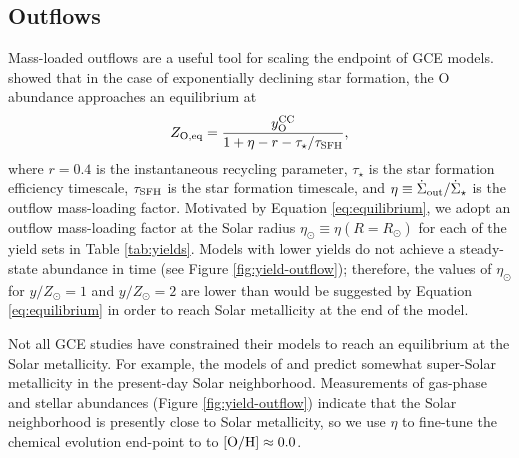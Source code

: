 \documentclass[twocolumn,twocolappendix,linenumbers]{aastex631}
\newcommand{\mathOH}{{\rm [O/H]}}
\newcommand{\yZ}[1]{$y/Z_\odot=#1$}
\begin{document}
\subsection{Outflows}
\label{sec:outflows}

Mass-loaded outflows are a useful tool for scaling the endpoint of GCE models. \citet{weinberg_equilibrium_2017} showed that in the case of exponentially declining star formation, the O abundance approaches an equilibrium at
\begin{equation}
    \label{eq:equilibrium}
    Z_{\rm O,eq} = \frac{y_{\rm O}^{\rm CC}}{1 + \eta - r - \tau_\star/\tau_{\rm SFH}},
\end{equation}
where $r=0.4$ is the instantaneous recycling parameter, $\tau_\star$ is the star formation efficiency timescale, $\tau_{\rm SFH}$ is the star formation timescale, and $\eta\equiv \dot\Sigma_{\rm out}/\dot\Sigma_\star$ is the outflow mass-loading factor. 
Motivated by Equation \ref{eq:equilibrium}, we adopt an outflow mass-loading factor at the Solar radius $\eta_\odot\equiv\eta(R=R_\odot)$ for each of the yield sets in Table \ref{tab:yields}. Models with lower yields do not achieve a steady-state abundance in time (see Figure \ref{fig:yield-outflow}); therefore, the values of $\eta_\odot$ for \yZ{1} and \yZ{2} are lower than would be suggested by Equation \ref{eq:equilibrium} in order to reach Solar metallicity at the end of the model.

Not all GCE studies have constrained their models to reach an equilibrium at the Solar metallicity. For example, the models of \citet{palla_chemical_2020} and \citet{spitoni_remind_2024} predict somewhat super-Solar metallicity in the present-day Solar neighborhood. Measurements of gas-phase \citep[e.g.,][]{mendez-delgado_gradients_2022} and stellar abundances (Figure \ref{fig:yield-outflow}) indicate that the Solar neighborhood is presently close to Solar metallicity, so we use $\eta$ to fine-tune the chemical evolution end-point to to $\mathOH\approx0.0$.
\end{document}
